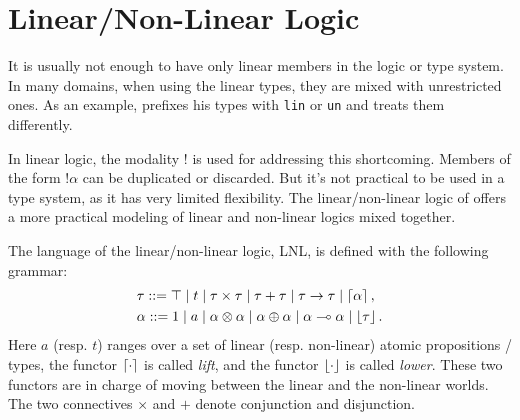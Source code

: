 \section{Linear/Non-Linear Logic}

It is usually not enough to have only linear members in the logic or type system. In many domains, when using the linear types, they are mixed with unrestricted ones. As an example, \cite{DavidWalker2004} prefixes his types with \texttt{lin} or \texttt{un} and treats them differently.

In linear logic, the modality $!$ is used for addressing this shortcoming. Members of the form $!\alpha$ can be duplicated or discarded. But it's not practical to be used in a type system, as it has very limited flexibility.
%
The linear/non-linear logic of \cite{DBLP:conf/csl/Benton94} offers a more practical modeling of linear and non-linear logics mixed together.

The language of the linear/non-linear logic, LNL, is defined with the following grammar:
\begin{align*}
    &\tau ::= \top \mid t \mid \tau \times \tau \mid \tau + \tau \mid \tau \rightarrow \tau \mid \left\lceil \alpha \right\rceil, \\
    &\alpha ::= 1 \mid a \mid \alpha \otimes \alpha \mid \alpha \oplus \alpha \mid \alpha \multimap \alpha \mid \left\lfloor \tau \right\rfloor.
\end{align*}
Here $a$ (resp. $t$) ranges over a set of linear (resp. non-linear) atomic propositions / types, the functor $\left\lceil \cdot \right\rceil$ is called \textit{lift}, and the functor $\left\lfloor \cdot \right\rfloor$ is called \textit{lower}. These two functors are in charge of moving between the linear and the non-linear worlds. The two connectives $\times$ and $+$ denote conjunction and disjunction.
